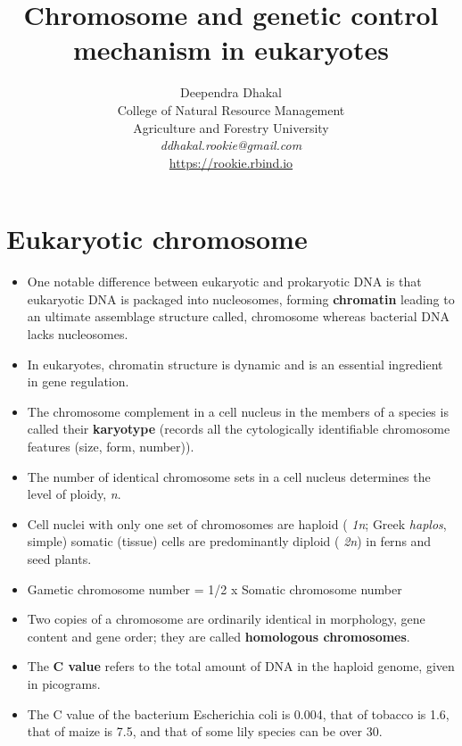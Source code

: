 \documentclass[11pt,dvipsnames,ignorenonframetext,aspectratio=169]{beamer}
\title[]{Chromosome and genetic control mechanism in eukaryotes}
\author[
        Deependra Dhakal\\
College of Natural Resource Management\\
Agriculture and Forestry University\\
\textit{ddhakal.rookie@gmail.com}\\
\url{https://rookie.rbind.io}
    ]{Deependra Dhakal\\
College of Natural Resource Management\\
Agriculture and Forestry University\\
\textit{ddhakal.rookie@gmail.com}\\
\url{https://rookie.rbind.io}}
\date[
      
  ]{
    }
\providecommand{\tightlist}{%
  \setlength{\itemsep}{0pt}\setlength{\parskip}{0pt}}
\begin{document}
  \begin{frame}[plain]
  \titlepage
  \end{frame}



\hypertarget{eukaryotic-chromosome}{%
\section{Eukaryotic chromosome}\label{eukaryotic-chromosome}}

\begin{frame}{}
\protect\hypertarget{section}{}
\begin{itemize}
\tightlist
\item
  One notable difference between eukaryotic and prokaryotic DNA is that
  eukaryotic DNA is packaged into nucleosomes, forming
  \textbf{chromatin} leading to an ultimate assemblage structure called,
  chromosome whereas bacterial DNA lacks nucleosomes.
\item
  In eukaryotes, chromatin structure is dynamic and is an essential
  ingredient in gene regulation.
\item
  The chromosome complement in a cell nucleus in the members of a
  species is called their \textbf{karyotype} (records all the
  cytologically identifiable chromosome features (size, form, number)).
\end{itemize}
\end{frame}

\begin{frame}{}
\protect\hypertarget{section-1}{}
\begin{itemize}
\tightlist
\item
  The number of identical chromosome sets in a cell nucleus determines
  the level of ploidy, \emph{n}.
\item
  Cell nuclei with only one set of chromosomes are haploid ( \emph{1n};
  Greek \emph{haplos}, simple) somatic (tissue) cells are predominantly
  diploid ( \emph{2n}) in ferns and seed plants.
\item
  Gametic chromosome number = 1/2 x Somatic chromosome number
\item
  Two copies of a chromosome are ordinarily identical in morphology,
  gene content and gene order; they are called \textbf{homologous
  chromosomes}.
\item
  The \textbf{C value} refers to the total amount of DNA in the haploid
  genome, given in picograms.
\item
  The C value of the bacterium Escherichia coli is 0.004, that of
  tobacco is 1.6, that of maize is 7.5, and that of some lily species
  can be over 30.
\end{itemize}
\end{frame}
\end{document}
